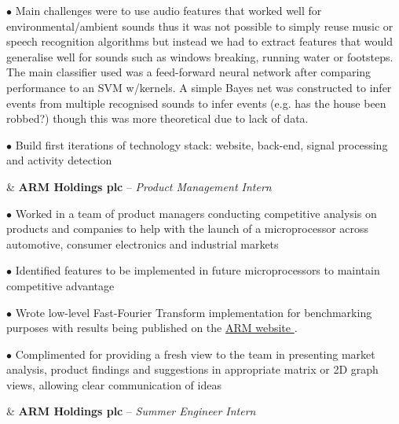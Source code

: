 \documentclass[a4paper,10pt,oneside]{article}
\begin{document}
\begin{body}
$\bullet$ Main challenges were to use audio features that worked well for environmental/ambient sounds thus it was not possible to simply reuse music or speech recognition algorithms but instead we had to extract features that would generalise well for sounds such as windows breaking, running water or footsteps. The main classifier used was a feed-forward neural network after comparing performance to an SVM w/kernels. A simple Bayes net was constructed to infer events from multiple recognised sounds to infer events (e.g. has the house been robbed?)  though this was more theoretical due to lack of data.

$\bullet$ Build first iterations of technology stack: website, back-end, signal processing and activity detection \\ 


{\textbf{} \par {}} & \textbf{ARM Holdings plc} – \textit{Product Management Intern}

$\bullet$ Worked in a team of product managers conducting competitive analysis on products and companies to help with the launch of a microprocessor across automotive, consumer electronics and industrial markets

$\bullet$ Identified features to be implemented in future microprocessors to maintain competitive advantage 

$\bullet$ Wrote low-level Fast-Fourier Transform implementation for benchmarking purposes with results being published on the \href{https://community.arm.com/processors/b/blog/posts/arm-dsp-is-the-way-to-go-an-intern-s-perspective?CommentSortBy=CreatedDate\&CommentSortOrder=Ascending}{ARM website \faChain}.

$\bullet$ Complimented for providing a fresh view to the team in presenting market analysis, product findings and suggestions in appropriate matrix or 2D graph views, allowing clear communication of ideas
\\ {\textbf{} \par {}} & \textbf{ARM Holdings plc} – \textit{Summer Engineer Intern}


\end{body}
\end{document}
